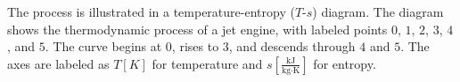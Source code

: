 The process is illustrated in a temperature-entropy (\( T \)-\( s \)) diagram. The diagram shows the thermodynamic process of a jet engine, with labeled points \( 0 \), \( 1 \), \( 2 \), \( 3 \), \( 4 \), and \( 5 \). The curve begins at \( 0 \), rises to \( 3 \), and descends through \( 4 \) and \( 5 \). The axes are labeled as \( T [K] \) for temperature and \( s [\frac{\text{kJ}}{\text{kg·K}}] \) for entropy.